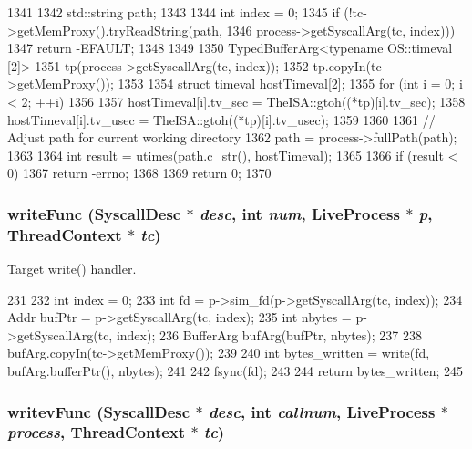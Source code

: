 \begin{DoxyCode}
1341 {
1342     std::string path;
1343 
1344     int index = 0;
1345     if (!tc->getMemProxy().tryReadString(path,
1346                 process->getSyscallArg(tc, index))) {
1347         return -EFAULT;
1348     }
1349 
1350     TypedBufferArg<typename OS::timeval [2]>
1351         tp(process->getSyscallArg(tc, index));
1352     tp.copyIn(tc->getMemProxy());
1353 
1354     struct timeval hostTimeval[2];
1355     for (int i = 0; i < 2; ++i)
1356     {
1357         hostTimeval[i].tv_sec = TheISA::gtoh((*tp)[i].tv_sec);
1358         hostTimeval[i].tv_usec = TheISA::gtoh((*tp)[i].tv_usec);
1359     }
1360 
1361     // Adjust path for current working directory
1362     path = process->fullPath(path);
1363 
1364     int result = utimes(path.c_str(), hostTimeval);
1365 
1366     if (result < 0)
1367         return -errno;
1368 
1369     return 0;
1370 }
\end{DoxyCode}
\hypertarget{syscall__emul_8hh_a0d5b24a5c07baeac543de44989b73d43}{
\subsubsection[{writeFunc}]{ writeFunc ({\bf SyscallDesc} $\ast$ {\em desc}, \/  int {\em num}, \/  {\bf LiveProcess} $\ast$ {\em p}, \/  {\bf ThreadContext} $\ast$ {\em tc})}}
\label{syscall__emul_8hh_a0d5b24a5c07baeac543de44989b73d43}


Target write() handler. 


\begin{DoxyCode}
231 {
232     int index = 0;
233     int fd = p->sim_fd(p->getSyscallArg(tc, index));
234     Addr bufPtr = p->getSyscallArg(tc, index);
235     int nbytes = p->getSyscallArg(tc, index);
236     BufferArg bufArg(bufPtr, nbytes);
237 
238     bufArg.copyIn(tc->getMemProxy());
239 
240     int bytes_written = write(fd, bufArg.bufferPtr(), nbytes);
241 
242     fsync(fd);
243 
244     return bytes_written;
245 }
\end{DoxyCode}
\hypertarget{syscall__emul_8hh_a5ddafb78a103551d95e66674ad49a104}{
\subsubsection[{writevFunc}]{ writevFunc ({\bf SyscallDesc} $\ast$ {\em desc}, \/  int {\em callnum}, \/  {\bf LiveProcess} $\ast$ {\em process}, \/  {\bf ThreadContext} $\ast$ {\em tc})}}
\label{syscall__emul_8hh_a5ddafb78a103551d95e66674ad49a104}


